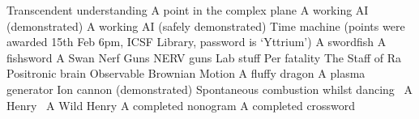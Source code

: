 \begin{multicols}{2}
\begin{small}
\begin{tabbing}
           {Transcendent understanding}
          {A point in the complex plane}
           {A working AI (demonstrated)}
          {A working AI (safely demonstrated)}
        {Time machine (points were awarded 15th Feb 6pm,
        ICSF Library, password is `Yttrium')}
          {A swordfish}
          {A fishsword}
          {A Swan}
           {Nerf Guns}
           {NERV guns}
          {Lab stuff}
         {Per fatality}
          {The Staff of Ra}
           {Positronic brain}
           {Observable Brownian Motion}
           {A fluffy dragon}
           {A plasma generator}
           {Ion cannon (demonstrated)}
         {Spontaneous combustion whilst dancing~\E}
           {A Henry~\E}
          {A Wild Henry}
          {A completed nonogram}
          {A completed crossword}
    \end{tabbing}
  \end{small}
\end{multicols}

\vfill

\begin{center}
\end{center}

\vfill

